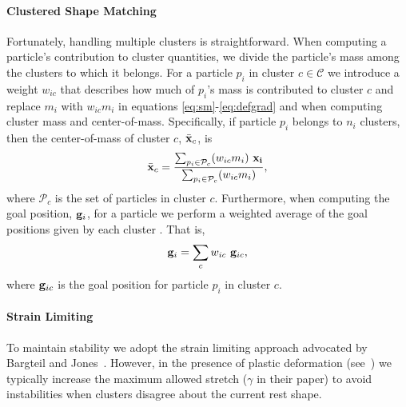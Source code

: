 \documentclass[conference]{acmsiggraph}
\begin{document}
\paragraph{Clustered Shape Matching}
Fortunately, handling multiple clusters is straightforward.  When computing a particle's contribution to 
cluster quantities, we divide the particle's mass among the clusters to which it belongs.
For a particle $p_i$ in cluster $c\in\mathcal{C}$ we introduce a weight $w_{ic}$ that
describes how much of $p_i$'s mass is contributed to cluster $c$
and replace $m_i$ with $w_{ic}m_i$ in equations \eqref{eq:sm}-\eqref{eq:defgrad} 
and when computing cluster mass and center-of-mass.
Specifically, if particle $p_i$ belongs
to $n_i$ clusters, then the center-of-mass of cluster $c$, $\bar{\mathit{\mathbf{x}}}_{c}$, is
\begin{equation}
\bar{\mathit{\mathbf{x}}}_{c} = \frac{\sum_{p_i\in\mathcal{P}_c}(w_{ic}m_i)~\mathit{\mathbf{x_i}}}{\sum_{p_i\in\mathcal{P}_c}(w_{ic}m_i)},
\end{equation}
where $\mathcal{P}_c$ is the set of particles in cluster $c$.
Furthermore, when computing the goal position, $\mathit{\mathbf{g}}_i$, for a particle we perform a weighted
average of the goal positions given by each cluster .  That is,
\begin{equation}
\mathit{\mathbf{g}}_i = \sum_c w_{ic} ~\mathit{\mathbf{g}}_{ic},
\end{equation}
where $\mathit{\mathbf{g}}_{ic}$ is the goal position for particle $p_i$ in cluster $c$.  


\paragraph{Strain Limiting}
To maintain stability we adopt the strain limiting approach advocated by Bargteil and Jones~.
However, in the presence of plastic deformation (see~) we typically increase the maximum allowed stretch ($\gamma$ in
their paper) to avoid instabilities when clusters disagree about the current rest shape.
\end{document}
